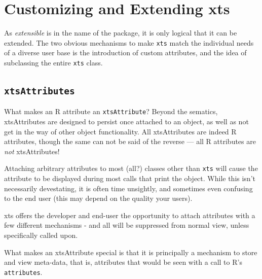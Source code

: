 \documentclass{article}
\begin{document}
\pagebreak
\section{Customizing and Extending xts}
As \emph{extensible} is in the name of
the package, it is only logical that it can be extended.
The two obvious mechanisms to make {\tt xts}
match the individual needs of a diverse user
base is the introduction of custom
attributes, and the idea of subclassing the entire
{\tt xts} class.

\subsection{{\tt xtsAttributes}}
What makes an R attribute an {\tt xtsAttribute}?
Beyond the sematics, xtsAttributes are designed to
persist once attached to an object, as well as not get
in the way of other object functionality.
All xtsAttributes are indeed R attributes, though 
the same can not be said of the reverse --- all
R attributes are \emph{not} xtsAttributes!

Attaching arbitrary attributes to most (all?) classes
other than {\tt xts} will cause the attribute to be displayed
during most calls that print the object.  While this isn't
necessarily devestating, it is often time unsightly, and sometimes
even confusing to the end user (this may depend on the quality your users).

xts offers the developer and end-user the opportunity to attach attributes
with a few different mechanisms - and all will be suppressed
from normal view, unless specifically called upon.

What makes an xtsAttribute special is that it
is principally a mechanism to store and view meta-data, that is,
attributes that would be seen with a call to R's
{\tt attributes}.
\end{document}
